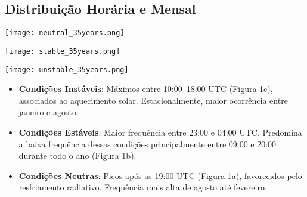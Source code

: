 \documentclass[12pt]{article}
\begin{document}
\subsection{Distribuição Horária e Mensal}
\begin{center}
    \begin{minipage}{0.49\textwidth}
        \centering
        \texttt{[image: neutral\_35years.png]}
    \end{minipage}
    \hfill
    \begin{minipage}{0.49\textwidth}
        \centering
        \texttt{[image: stable\_35years.png]}
    \end{minipage}

    \vspace{0.5cm}
    \texttt{[image: unstable\_35years.png]}
    
    \label{fig:clima}
\end{center}
\begin{itemize}
    \item \textbf{Condições Instáveis}: Máximos entre 10:00–18:00 UTC (Figura 1c), associados ao aquecimento solar. Estacionalmente, maior ocorrência entre janeiro e agosto.
    \item \textbf{Condições Estáveis}: Maior frequência entre 23:00 e 04:00 UTC. Predomina a baixa frequência dessas condições principalmente entre 09:00 e 20:00 durante todo o ano (Figura 1b).
    \item \textbf{Condições Neutras}: Picos após as 19:00 UTC (Figura 1a), favorecidos pelo resfriamento radiativo. Frequência mais alta de agosto até fevereiro.
\end{itemize}




\end{document}
